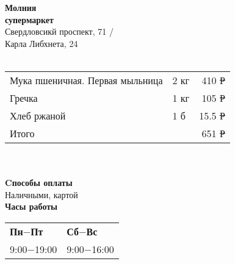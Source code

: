\documentclass[12pt ]{extarticle}
\begin{document}
\begin{preview}
\begin{flushleft}
\begin{trivlist}
    \vspace{0.5cm}
  \item
    \textbf{{\large Молния} \\
      супермаркет}\\
    Свердловсикй проспект, 71 /\\
    Карла Либхнета, 24\\
    \vspace{0.2cm}
    \hdashrule{6.5cm}{1pt}{1pt}\\
    \vspace{0.5cm}
    \begin{tabular}{p{3cm}p{1.2cm}r}
       Мука пшеничная. Первая мыльница  & 2 кг & 410 \sout{Р} \\
       Гречка  & 1 кг & 105 \sout{Р} \\
      Хлеб ржаной  & 1 б & 15.5 \sout{Р} \\
       Итого  &   & 651 \sout{Р} \\
    \end{tabular}\\
    \vspace{0.22cm}
    \hdashrule{6.5cm}{1pt}{1pt}\\
    \vspace{0.5cm}
    \textbf{Cпособы оплаты} \\
    Наличными, картой \\
    \vspace{0.5cm}
    \textbf{Часы работы} \\
    \begin{tabular}{p{3.2cm}p{3.2cm}}
       \textbf{Пн$-$Пт}  & \textbf{Сб$-$Вс} \\
       9:00$-$19:00 & 9:00$-$16:00 \\
    \end{tabular}\\
    \vspace{0.4cm}
    \hdashrule{6.5cm}{1pt}{}\\
    \vspace{0.5cm}

  \end{trivlist}




\end{flushleft}
\end{preview}
\end{document}
